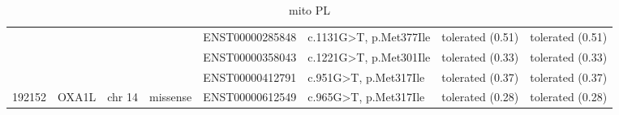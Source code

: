 \begin{landscape}
\begin{table}[]
{\begin{tabular}{|l|l|l|l|l|l|l|l|}
{\color[HTML]{000000} }                         & {\color[HTML]{000000} }                         & {\color[HTML]{000000} }                         & {\color[HTML]{000000} }                           & {\color[HTML]{000000} ENST00000285848}     & {\color[HTML]{000000} c.1131G\textgreater{}T, p.Met377Ile} & {\color[HTML]{000000} tolerated (0.51)}                  & tolerated (0.51)                  \\ \cline{5-8} 
{\color[HTML]{000000} }                         & {\color[HTML]{000000} }                         & {\color[HTML]{000000} }                         & {\color[HTML]{000000} }                           & {\color[HTML]{000000} ENST00000358043}     & {\color[HTML]{000000} c.1221G\textgreater{}T, p.Met301Ile} & {\color[HTML]{000000} tolerated (0.33)}                  & tolerated (0.33)                  \\ \cline{5-8} 
{\color[HTML]{000000} }                         & {\color[HTML]{000000} }                         & {\color[HTML]{000000} }                         & {\color[HTML]{000000} }                           & {\color[HTML]{000000} ENST00000412791}     & {\color[HTML]{000000} c.951G\textgreater{}T, p.Met317Ile}  & {\color[HTML]{000000} tolerated (0.37)}                  & tolerated (0.37)                  \\ \cline{5-8} 
\multirow{-4}{*}{{\color[HTML]{000000} 192152}} & \multirow{-4}{*}{{\color[HTML]{000000} OXA1L}}  & \multirow{-4}{*}{{\color[HTML]{000000} chr 14}} & \multirow{-4}{*}{{\color[HTML]{000000} missense}} & {\color[HTML]{000000} ENST00000612549}     & {\color[HTML]{000000} c.965G\textgreater{}T, p.Met317Ile}  & {\color[HTML]{000000} tolerated (0.28)}                  & tolerated (0.28)                  \\ \hline
\end{tabular}%
}
\caption{mito PL}
\label{tab:mito}
\end{table}
\end{landscape}


\begin{landscape}
\begin{table}[]
\caption{\textit{FMNL2} TT haplotype - HGVS - Human Genome Variation Society}
\label{tab:fmnl2}
\end{table}
\end{landscape}